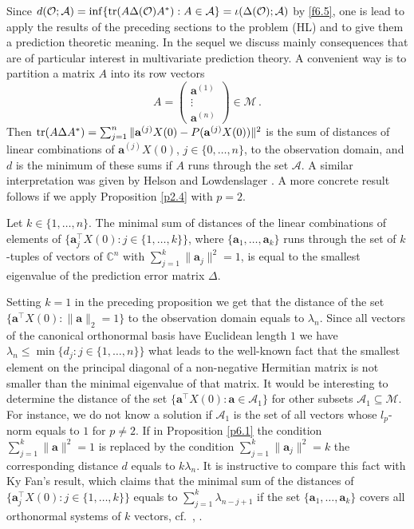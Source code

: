 \documentclass{amsart}
\begin{document}
Since $d({\mathcal O} ; {\mathcal A}) = \inf \{ {\rm tr}(A \Delta({\mathcal O}) A^*): A \in {\mathcal A} \} = \iota ( \Delta({\mathcal O}) ; {\mathcal A})$ by \eqref{f6.5}, one is lead to apply the results of the preceding sections to the problem (HL) and to give them a prediction theoretic meaning. In the sequel we discuss mainly consequences that are of particular interest in multivariate prediction theory. A convenient way is to partition a matrix $A$ into its row vectors
\[
   A = \left( \begin{array}{c} {\mathbf a}^{(1)} \\ \vdots \\ {\mathbf a}^{(n)} \end{array} \right) \in {\mathcal M} \, .
\]
Then ${\rm tr}(A \Delta A^*) = \sum_{j=1}^n \| {\mathbf a}^{(j)} X(0) - P({\mathbf a}^{(j)} X(0) )\|^2$ is the sum of distances of linear combinations of ${\mathbf a}^{(j)}X(0)$, $j\in \{ 0,\ldots,n \}$, to the observation domain, and $d$ is the minimum of these sums if $A$ runs through the set $\mathcal A$. A similar interpretation was given by Helson and Lowdenslager \cite[Thm.~11]{HL}. A more concrete result follows if we apply Proposition \ref{p2.4} with $p=2$.

\begin{pro}   \label{p6.1}
   Let $k \in \{ 1,\ldots, n \}$. The minimal sum of distances of the linear combinations of elements of  $\{ {\mathbf a}_j^\top X(0) : j \in \{ 1,\ldots,k \} \}$, where $\{ {\mathbf a}_1 ,\ldots, {\mathbf a}_k \}$ runs through the set of $k$-tuples of vectors of ${\mathbb C}^n$ with $\sum_{j=1}^k \| {\mathbf a}_j \|^2 =1$, is equal to the smallest eigenvalue of the prediction error matrix $\Delta$.
\end{pro}   

Setting $k=1$ in the preceding proposition we get that the distance of the set $\{ {\mathbf a}^\top X(0) : \| {\mathbf a}\|_2=1 \}$ to the observation domain equals to $\lambda_n$. Since all vectors of the canonical orthonormal basis have Euclidean length $1$ we have $\lambda_n \leq \min \{ d_j : j \in \{ 1,\ldots,n \} \}$ what leads to the well-known fact that the smallest element on the principal diagonal of a non-negative Hermitian matrix is not smaller than the minimal eigenvalue of that matrix. It would be interesting to determine the distance of the set $\{ {\mathbf a}^\top X(0) : {\mathbf a}  \in {\mathcal A}_1 \}$ for other subsets ${\mathcal A}_1 \subseteq \mathcal M$. For instance, we do not know a solution if ${\mathcal A}_1$ is the set of all vectors whose $l_p$-norm equals to $1$ for $p \not= 2$. If in Proposition \ref{p6.1} the condition $\sum_{j=1}^k \| {\mathbf a} \|^2=1$ is replaced by the condition $\sum_{j=1}^k \| {\mathbf a}_j \|^2=k$ the corresponding distance $d$ equals to $k \lambda_n$. It is instructive to compare this fact with Ky Fan's result, which claims that the minimal sum of the distances of $\{ {\mathbf a}_j^\top X(0) : j \in \{ 1,\ldots,k \} \}$ equals to $\sum_{j=1}^k \lambda_{n-j+1}$ if the set $\{ {\mathbf a}_1,\ldots,{\mathbf a}_k \}$ covers all orthonormal systems of $k$ vectors, cf.~\cite[Thm.~20.A.2]{MOA}, \cite{Fan}. 
\end{document}
